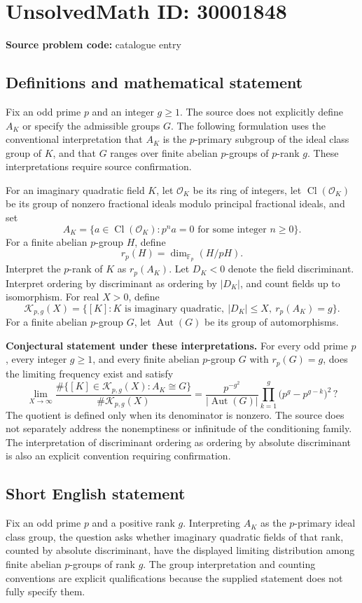 \documentclass[11pt]{article}
\newcommand{\F}{\mathbb{F}}
\begin{document}
\section*{UnsolvedMath ID: 30001848}
\textbf{Source problem code:} catalogue entry
\subsection{Definitions and mathematical statement}
Fix an odd prime \(p\) and an integer \(g\geq 1\). The source does not explicitly define \(A_K\) or specify the admissible groups \(G\). The following formulation uses the conventional interpretation that \(A_K\) is the \(p\)-primary subgroup of the ideal class group of \(K\), and that \(G\) ranges over finite abelian \(p\)-groups of \(p\)-rank \(g\). These interpretations require source confirmation.

For an imaginary quadratic field \(K\), let \(\mathcal O_K\) be its ring of integers, let \(\operatorname{Cl}(\mathcal O_K)\) be its group of nonzero fractional ideals modulo principal fractional ideals, and set
\[
A_K=\{a\in\operatorname{Cl}(\mathcal O_K):p^n a=0\text{ for some integer }n\geq 0\}.
\]
For a finite abelian \(p\)-group \(H\), define
\[
r_p(H)=\dim_{\F_p}(H/pH).
\]
Interpret the \(p\)-rank of \(K\) as \(r_p(A_K)\). Let \(D_K<0\) denote the field discriminant. Interpret ordering by discriminant as ordering by \(|D_K|\), and count fields up to isomorphism. For real \(X>0\), define
\[
\mathcal K_{p,g}(X)=\{[K]:K\text{ is imaginary quadratic},\ |D_K|\leq X,\ r_p(A_K)=g\}.
\]
For a finite abelian \(p\)-group \(G\), let \(\operatorname{Aut}(G)\) be its group of automorphisms.

\textbf{Conjectural statement under these interpretations.} For every odd prime \(p\), every integer \(g\geq 1\), and every finite abelian \(p\)-group \(G\) with \(r_p(G)=g\), does the limiting frequency exist and satisfy
\[
\lim_{X\to\infty}
\frac{\#\{[K]\in\mathcal K_{p,g}(X):A_K\cong G\}}
{\#\mathcal K_{p,g}(X)}
=
\frac{p^{-g^2}}{|\operatorname{Aut}(G)|}
\prod_{k=1}^{g}\bigl(p^g-p^{g-k}\bigr)^2\,?
\]
The quotient is defined only when its denominator is nonzero. The source does not separately address the nonemptiness or infinitude of the conditioning family. The interpretation of discriminant ordering as ordering by absolute discriminant is also an explicit convention requiring confirmation.
\subsection{Short English statement}
Fix an odd prime \(p\) and a positive rank \(g\). Interpreting \(A_K\) as the \(p\)-primary ideal class group, the question asks whether imaginary quadratic fields of that rank, counted by absolute discriminant, have the displayed limiting distribution among finite abelian \(p\)-groups of rank \(g\). The group interpretation and counting conventions are explicit qualifications because the supplied statement does not fully specify them.
\end{document}
